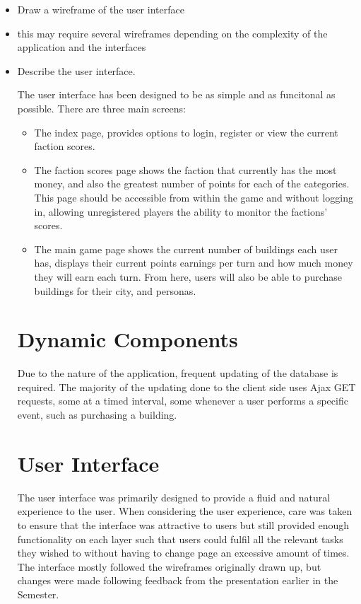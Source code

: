\documentclass{sig-alt-release2}
\begin{document}
\begin{itemize}

\item	Draw a wireframe of the user interface 

\item	this may require several wireframes depending on the complexity of the application and the interfaces

\item	Describe the user interface.

The user interface has been designed to be as simple and as funcitonal as possible. 
There are three main screens: 
\begin{itemize}
\item The index  page, provides options to login, register or view the current faction scores.
\item The faction scores page shows the faction that currently has the most money, and also the greatest number of points for each of the categories. This page should be accessible from within the game and without logging in, allowing unregistered players the ability to monitor the factions' scores.
\item The main game page shows the current number of buildings each user has, displays their current points earnings per turn and how much money they will earn each turn. From here, users will also be able to purchase buildings for their city, and personas.
\end{itemize}

\section{Dynamic Components}
Due to the nature of the application, frequent updating of the database is required. The majority of the updating done to the client side uses Ajax GET requests, some at a timed interval, some whenever a user performs a specific event, such as purchasing a building.

\section{User Interface}
The user interface was primarily designed to provide a fluid and natural experience to the user. When considering the user experience, care was taken to ensure that the interface was attractive to users but still provided enough functionality on each layer such that users could fulfil all the relevant tasks they wished to without having to change page an excessive amount of times. \\
The interface mostly followed the wireframes originally drawn up, but changes were made following feedback from the presentation earlier in the Semester. 


\end{itemize}
\end{document}
